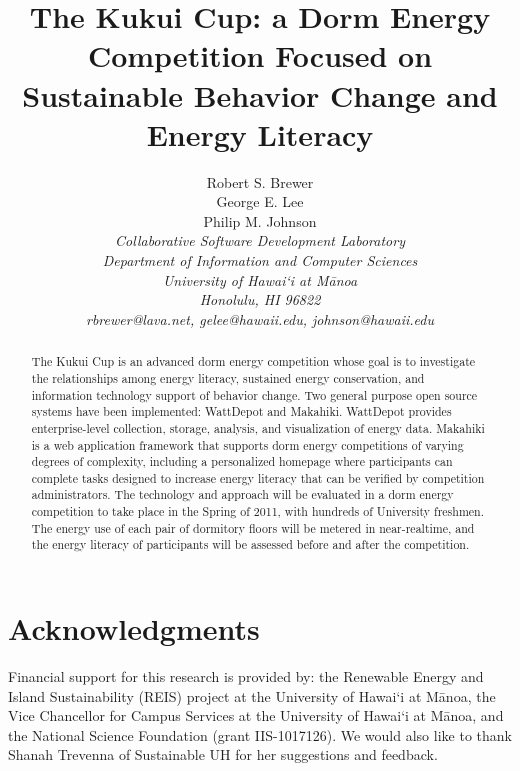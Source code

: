\documentclass[conference,peerreview]{IEEEtran}
\begin{document}
\title{The Kukui Cup: a Dorm Energy Competition Focused on Sustainable Behavior Change and Energy Literacy}

\author{Robert S. Brewer\\
        George E. Lee \\
        Philip M. Johnson\\
\em     Collaborative Software Development Laboratory\\
        Department of Information and Computer Sciences\\
        University of Hawai`i at M\=anoa\\
        Honolulu, HI 96822\\
        rbrewer@lava.net, gelee@hawaii.edu, johnson@hawaii.edu\\
}


\IEEEpeerreviewmaketitle

\begin{abstract}  %
The Kukui Cup is an advanced dorm energy competition whose goal is to
investigate the relationships among energy literacy, sustained energy
conservation, and information technology support of behavior change. Two
general purpose open source systems have been implemented: WattDepot and
Makahiki. WattDepot provides enterprise-level collection, storage, analysis,
and visualization of energy data. Makahiki is a web application framework that
supports dorm energy competitions of varying degrees of complexity,
including a personalized homepage where participants can complete tasks
designed to increase energy literacy that can be verified by competition
administrators. The technology and approach will be evaluated in a dorm energy
competition to take place in the Spring of 2011, with hundreds of University
freshmen. The energy use of each pair of dormitory floors will be metered in
near-realtime, and the energy literacy of participants will be assessed before
and after the competition.
\end{abstract}







\section{Acknowledgments}

Financial support for this research is provided by: the Renewable Energy and
Island Sustainability (REIS) project at the University of Hawai`i at M\=anoa,
the Vice Chancellor for Campus Services at the University of Hawai`i at M\=anoa,
and the National Science Foundation (grant IIS-1017126). We would also like to
thank Shanah Trevenna of Sustainable UH for her suggestions and feedback.



\end{document}
